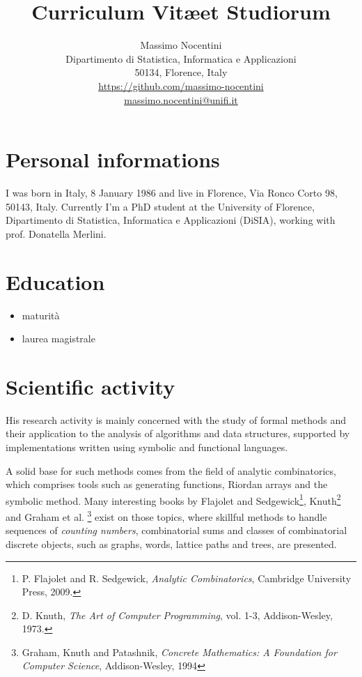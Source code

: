 \documentclass[10pt,a4paper]{scrartcl}
\begin{document}
    \title{Curriculum Vit\ae et Studiorum}

    \author{Massimo Nocentini\\ 
        \small{Dipartimento di Statistica, Informatica e Applicazioni}\\
        \small{50134, Florence, Italy}\\
        \small{\url{https://github.com/massimo-nocentini}}\\
        \small{\url{massimo.nocentini@unifi.it}}
        }

    \maketitle

    \section{Personal informations}
    
    I was born in Italy, 8 January 1986 and live in Florence, Via Ronco Corto 98,
    50143, Italy. Currently I'm a PhD student at the University of Florence, 
    Dipartimento di Statistica, Informatica e Applicazioni (DiSIA), working
    with prof. Donatella Merlini.

    \section{Education}
    \begin{itemize}
        \item maturit\`a
        \item laurea magistrale
    \end{itemize}

    \section{Scientific activity}
    
    His research activity is mainly concerned with the study of 
    formal methods and their application to the analysis of algorithms and data structures, 
    supported by implementations written using symbolic and functional languages.

    A solid base for such methods comes from the field of analytic combinatorics, 
    which comprises tools such as generating functions, Riordan arrays and the symbolic method. Many
    interesting books by Flajolet and Sedgewick\footnote{P. Flajolet and R.
    Sedgewick, \emph{Analytic Combinatorics}, Cambridge University Press, 2009.},
    Knuth\footnote{D. Knuth, \emph{The Art of Computer Programming}, vol.  1-3,
    Addison-Wesley, 1973.} and Graham et al. \footnote{Graham, Knuth and Patashnik,
    \emph{Concrete Mathematics: A Foundation for Computer Science}, Addison-Wesley,
    1994} exist on those topics, where skillful methods to handle sequences of
    \emph{counting numbers}, combinatorial sums and classes of combinatorial
    discrete objects, such as graphs, words, lattice paths and trees, are
    presented. 
\end{document}
